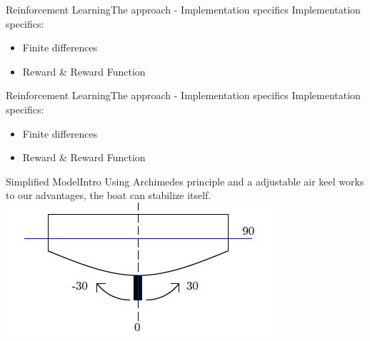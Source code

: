 \documentclass{beamer}
\newtheorem{algorithm}{Algorithm}
\begin{document}
\begin{frame}{Reinforcement Learning}{The approach - Implementation specifics\vphantom{(y}}
\vspace{-0.7em}
Implementation specifics:
\begin{itemize}
  \item {\color{blue}Finite differences}
  \item Reward \& Reward Function
\end{itemize}

\end{frame}

\begin{frame}{Reinforcement Learning}{The approach - Implementation specifics\vphantom{(y}}
\vspace{-0.7em}
Implementation specifics:
\begin{itemize}
  \item Finite differences
  \item {\color{blue}Reward \& Reward Function}
\end{itemize}
\end{frame}


\begin{frame}{Simplified Model}{Intro\vphantom{(y}}
\vspace{-0.7em}
Using Archimedes principle and a adjustable air keel works to our advantages, the boat can stabilize itself.
\includegraphics{images/boat_keel.JPG}
\end{frame}
\end{document}
